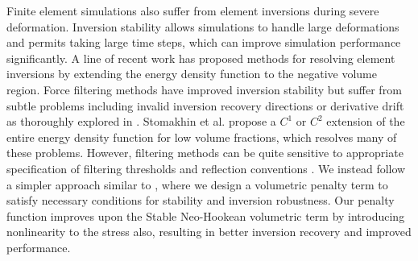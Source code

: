 Finite element simulations also suffer from element inversions during severe deformation.
Inversion stability allows simulations to handle large deformations and permits taking large time
steps, which can improve simulation performance significantly.
A line of recent work has proposed methods for resolving element inversions by extending the energy
density function to the negative volume region.  Force filtering methods
\cite{Irving:2004,Teran:2005} have improved inversion stability but suffer from subtle problems
including invalid inversion recovery directions or derivative drift as thoroughly explored in
\cite{Smith:2018}. Stomakhin et al.  propose a $C^1$ or $C^2$ extension of the
entire energy density function for low volume fractions, which resolves many of these problems.
However, filtering methods can be quite sensitive to appropriate specification of filtering thresholds
and reflection conventions \cite{wang:2016}. We instead follow a simpler approach similar to \cite{Smith:2018},
where we design a volumetric penalty term to satisfy necessary conditions for stability and inversion
robustness. Our penalty function improves upon the Stable Neo-Hookean volumetric term by introducing nonlinearity
to the stress also, resulting in better inversion recovery and improved performance.